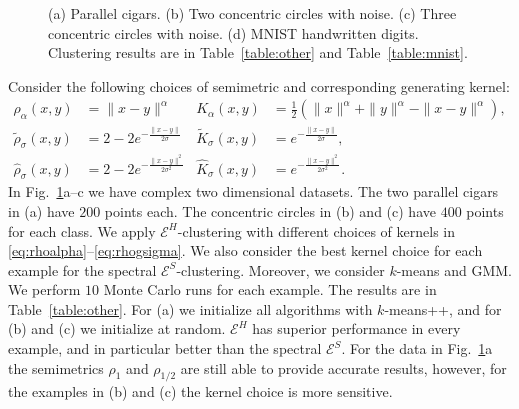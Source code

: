 \documentclass[aps,preprint,nofootinbib,floatfix]{revtex4-1}
\newcommand\kk{K}
\begin{document}
\begin{figure}
\begin{minipage}{0.23\textwidth}
\end{minipage}
\caption{\label{fig:other}
(a) Parallel cigars. (b) Two  
concentric circles with noise. (c) Three
concentric circles with noise. (d) MNIST handwritten digits.
Clustering results are in Table~\ref{table:other}
and Table~\ref{table:mnist}.
}
\end{figure}

Consider the following choices of semimetric and 
corresponding generating kernel:
\begin{align}
\rho_{\alpha}(x,y) &= \| x - y\|^\alpha & 
\kk_{\alpha}(x,y) &= \tfrac{1}{2}\left(
\| x \|^\alpha +
\| y \|^\alpha -
\| x-y \|^\alpha \right) ,
\label{eq:rhoalpha} \\
%
\widetilde{\rho}_{\sigma}(x,y) &= 2 - 2 e^{-\tfrac{\|x-y\|}{2 \sigma}} &
\widetilde{\kk}_{\sigma}(x,y) &= e^{-\tfrac{\|x-y\|}{2\sigma}} ,
\label{eq:rhoesigma} \\
%
\widehat{\rho}_{\sigma}(x,y) &= 2 - 2 e^{-\tfrac{\|x-y\|^2}{2 \sigma^2}} &
\widehat{\kk}_{\sigma}(x,y) &= e^{-\tfrac{\|x-y\|^2}{2\sigma^2}} .
\label{eq:rhogsigma} 
\end{align}
In Fig.~\ref{fig:other}a--c we have 
complex two dimensional datasets. The two parallel cigars in (a)
have $200$ points each. The concentric circles
in (b) and (c) have $400$ points for each class.
We apply $\mathcal{E}^H$-clustering  with different choices
of kernels in \eqref{eq:rhoalpha}--\eqref{eq:rhogsigma}. We also consider
the best kernel choice for each example for the spectral
$\mathcal{E}^S$-clustering. 
Moreover, we consider
$k$-means and GMM. We perform $10$ Monte Carlo runs for each example.
The results are in Table~\ref{table:other}.
For (a) we initialize
all algorithms with $k$-means++, and for (b) and (c) we initialize at
random.
$\mathcal{E}^H$ has superior performance
in every example, and in particular better than the
spectral $\mathcal{E}^S$.
For the data in Fig.~\ref{fig:other}a 
the semimetrics $\rho_1$ and $\rho_{1/2}$ are
still able to provide accurate results, however, for the
examples in (b) and (c) the kernel choice is more sensitive.
\end{document}
